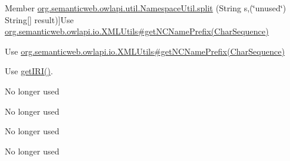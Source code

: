 \begin{DoxyRefList}
\hypertarget{deprecated__deprecated000027}{}%
Member \hyperlink{classorg_1_1semanticweb_1_1owlapi_1_1util_1_1_namespace_util_a2c251ad3aa8b5a352bdaf0d4935bb7a1}{org.semanticweb.owlapi.util.Namespace\-Util.split} (String s,(\char`\"{}unused\char`\"{}) String\mbox{[}\mbox{]} result)]Use \hyperlink{classorg_1_1semanticweb_1_1owlapi_1_1io_1_1_x_m_l_utils_a977782088cd022dae37a97174f98d623}{org.\-semanticweb.\-owlapi.\-io.\-X\-M\-L\-Utils\#get\-N\-C\-Name\-Prefix(\-Char\-Sequence)}  
\item[\label{deprecated__deprecated000028}%
\hypertarget{deprecated__deprecated000028}{}%
Member \hyperlink{classorg_1_1semanticweb_1_1owlapi_1_1util_1_1_namespace_util_a0b5dc7c6aaf453f563f705dcbb66aea3}{org.semanticweb.owlapi.util.Namespace\-Util.split} (String s)]Use \hyperlink{classorg_1_1semanticweb_1_1owlapi_1_1io_1_1_x_m_l_utils_a977782088cd022dae37a97174f98d623}{org.\-semanticweb.\-owlapi.\-io.\-X\-M\-L\-Utils\#get\-N\-C\-Name\-Prefix(\-Char\-Sequence)}  
\item[\label{deprecated__deprecated000029}%
\hypertarget{deprecated__deprecated000029}{}%
Member \hyperlink{enumorg_1_1semanticweb_1_1owlapi_1_1vocab_1_1_o_w_l2_datatype_a06659a58fd5fd7f53c1779d2e0298d36}{org.semanticweb.owlapi.vocab.O\-W\-L2\-Datatype.get\-U\-R\-I} ()]Use \hyperlink{}{get\-I\-R\-I()}.  
\item[\label{deprecated__deprecated000032}%
\hypertarget{deprecated__deprecated000032}{}%
Member \hyperlink{enumorg_1_1semanticweb_1_1owlapi_1_1vocab_1_1_s_k_o_s_vocabulary_a3574d28111ff2d56f30a6df7ff17ff3a}{org.semanticweb.owlapi.vocab.S\-K\-O\-S\-Vocabulary.C\-O\-L\-L\-E\-C\-T\-A\-B\-L\-E\-P\-R\-O\-P\-E\-R\-T\-Y} ]No longer used  
\item[\label{deprecated__deprecated000034}%
\hypertarget{deprecated__deprecated000034}{}%
Member \hyperlink{enumorg_1_1semanticweb_1_1owlapi_1_1vocab_1_1_s_k_o_s_vocabulary_ab80f9b35a4fc2f81e4e3e127c005fbb3}{org.semanticweb.owlapi.vocab.S\-K\-O\-S\-Vocabulary.C\-O\-M\-M\-E\-N\-T} ]No longer used  
\item[\label{deprecated__deprecated000030}%
\hypertarget{deprecated__deprecated000030}{}%
Member \hyperlink{enumorg_1_1semanticweb_1_1owlapi_1_1vocab_1_1_s_k_o_s_vocabulary_aa63a012f594872b8f55e5b762bfb9035}{org.semanticweb.owlapi.vocab.S\-K\-O\-S\-Vocabulary.D\-O\-C\-U\-M\-E\-N\-T} ]No longer used  
\item[\label{deprecated__deprecated000031}%
\hypertarget{deprecated__deprecated000031}{}%
Member \hyperlink{enumorg_1_1semanticweb_1_1owlapi_1_1vocab_1_1_s_k_o_s_vocabulary_ad59a5a2e40347065dfe0b0fedb59643d}{org.semanticweb.owlapi.vocab.S\-K\-O\-S\-Vocabulary.I\-M\-A\-G\-E} ]No longer used  

\end{DoxyRefList}
